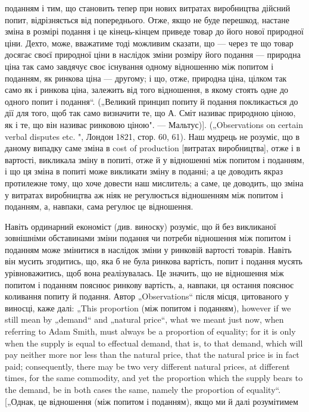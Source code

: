 {поданням і тим, що становить тепер при нових витратах виробництва дійсний
попит, відрізняється від попереднього. Отже, якщо не буде перешкод,
настане зміна в розмірі подання і це кінець-кінцем приведе товар до його
нової природної ціни. Дехто, може, вважатиме тоді можливим сказати, що —
через те що товар досягає своєї природної ціни в наслідок зміни розміру
його подання — природна ціна так само завдячує своє існування одному відношенню
між попитом і поданням, як ринкова ціна — другому; і що, отже,
природна ціна, цілком так само як і ринкова ціна, залежить від того відношення,
в якому стоять одне до одного попит і подання“. („Великий принцип
попиту й подання покликається до дії для того, щоб так само визначити
те, що А. Сміт називає природною ціною, як і те, що він називає ринковою
ціною". — Мальтус)]. („Observations on certain verbal disputes etc. ", Лондон 1821,
стор. 60, 61). Наш мудрець не розуміє, що в даному випадку саме зміна в cost
of production [витратах виробництва], отже і в вартості, викликала зміну в попиті,
отже й у відношенні між попитом і поданням, і що ця зміна в попиті
може викликати зміну в поданні; а це доводить якраз протилежне тому, що
хоче довести наш мислитель; а саме, це доводить, що зміна у витратах виробництва
аж ніяк не регулюється відношенням між попитом і поданням, а, навпаки,
сама регулює це відношення.}

Навіть ординарний економіст (див. виноску) розуміє, що
й без викликаної зовнішніми обставинами зміни подання чи потреби
відношення між попитом і поданням може змінитися
в наслідок зміни у ринковій вартості товарів. Навіть він мусить
згодитись, що, яка б не була ринкова вартість, попит і подання
мусять урівноважитись, щоб вона реалізувалась. Це значить,
що не відношення між попитом і поданням пояснює ринкову
вартість, а, навпаки, ця остання пояснює коливання попиту
й подання. Автор „Observations“ після місця, цитованого у виносці,
каже далі: „This proportion (між попитом і поданням),
however if we still mean by „demand“ and „natural price“, what
we meant just now, when referring to Adam Smith, must always
be a proportion of equality; for it is only when the supply is equal
to effectual demand, that is, to that demand, which will pay neither
more nor less than the natural price, that the natural price is in
fact paid; consequently, there may be two very different natural
prices, at different times, for the same commodity, and yet the
proportion which the supply bears to the demand, be in both cases
the same, namely the proportion of equality“. [„Однак, це відношення
(між попитом і поданням), якщо ми й далі розумітимем
\parbreak{}  %
